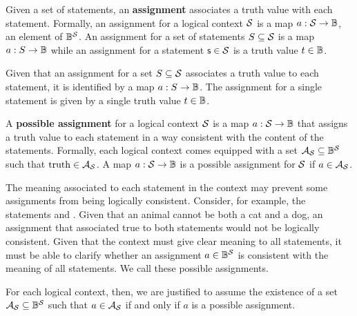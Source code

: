 \begin{mathSection}
	\begin{defn}
		Given a set of statements, an \textbf{assignment} associates a truth value with each statement. Formally, an assignment for a logical context $\mathcal{S}$ is a map $a : \mathcal{S} \to \mathbb{B}$, an element of $\mathbb{B}^{\mathcal{S}}$. An assignment for a set of statements $S \subseteq \mathcal{S}$ is a map $a : S \to \mathbb{B}$ while an assignment for a statement $\mathsf{s} \in \mathcal{S}$ is a truth value $t \in \mathbb{B}$.
	\end{defn}
	
	\begin{justification}
		Given that an assignment for a set $S \subseteq \mathcal{S}$ associates a truth value to each statement, it is identified by a map $a : S \to \mathbb{B}$. The assignment for a single statement is given by a single truth value $t \in \mathbb{B}$.
	\end{justification}
	
	\begin{axiom}\label{pm-vs-axiomPossibility}
		A \textbf{possible assignment} for a logical context $\mathcal{S}$ is a map $a : \mathcal{S} \to \mathbb{B}$ that assigns a truth value to each statement in a way consistent with the content of the statements. Formally, each logical context comes equipped with a set $\mathcal{A}_{\mathcal{S}} \subseteq \mathbb{B}^{\mathcal{S}}$ such that $\operatorname{truth} \in \mathcal{A}_{\mathcal{S}}$. A map $a : \mathcal{S} \to \mathbb{B}$ is a possible assignment for $\mathcal{S}$ if $a \in \mathcal{A}_{\mathcal{S}}$.
	\end{axiom}
	
	\begin{justification}
		The meaning associated to each statement in the context may prevent some assignments from being logically consistent. Consider, for example, the statements  and . Given that an animal cannot be both a cat and a dog, an assignment that associated true to both statements would not be logically consistent. Given that the context must give clear meaning to all statements, it must be able to clarify whether an assignment $a \in \mathbb{B}^{\mathcal{S}}$ is consistent with the meaning of all statements. We call these possible assignments.
		
		For each logical context, then, we are justified to assume the existence of a set $\mathcal{A}_{\mathcal{S}} \subseteq \mathbb{B}^{\mathcal{S}}$ such that $a \in \mathcal{A}_{\mathcal{S}}$ if and only if $a$ is a possible assignment.
	\end{justification}
	

\end{mathSection}
